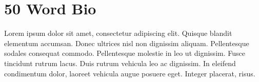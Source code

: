 \section*{50 Word Bio}
Lorem ipsum dolor sit amet, consectetur adipiscing elit. Quisque
blandit elementum accumsan. Donec ultrices nisl non dignissim
aliquam. Pellentesque sodales consequat commodo. Pellentesque
molestie in leo ut dignissim. Fusce tincidunt rutrum lacus. Duis
rutrum vehicula leo ac dignissim. In eleifend condimentum dolor,
laoreet vehicula augue posuere eget. Integer placerat, risus. 
